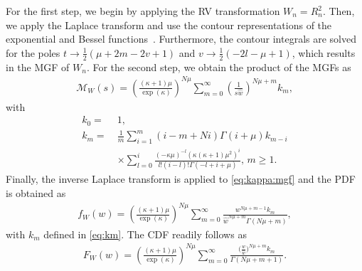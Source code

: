 \documentclass[journal,twocolumn]{IEEEtran}
\begin{document}
For the first step, we begin by applying the \ac{RV} transformation $W_n = R_n^2$. Then, we apply the Laplace transform and use the contour representations of the exponential and Bessel functions~\cite[Eq.~(03.02.07.0009.01)]{WolframResearch}. Furthermore, the contour integrals are solved for the poles $t\to \frac{1}{2} (\mu +2 m-2 v+1)$ and $v\to \frac{1}{2} (-2 l-\mu +1)$, which results in the \ac{MGF} of $W_n$. For the second step, we obtain the product of the \acp{MGF} as
\begin{align} \label{eq:kappa:mgf}
        \mathcal{M}_W (s) = \left(\frac{(\kappa +1) \mu }{\exp(\kappa) }\right)^{N \mu } \sum_{m=0}^{\infty}\left(\frac{1}{s \hat{w}}\right)^{N \mu + m} k_m,
\end{align}
with
\begin{subequations} \label{eq:km}
\begin{align}
    k_0 = \ & 1, \label{eq:km0} \\
    k_m = \ & \frac{1}{m} \sum_{i=1}^{m}(i-m+N i) \Gamma (i+\mu ) k_{m-i} \nonumber \\
    & \times \sum_{l=0}^i \frac{\left(-\kappa  \mu \right)^{-l} \left(\kappa  (\kappa +1) \mu ^2\right)^i}{l! (i-l)! \Gamma (-l+i+\mu )}, \, m\geq 1. \label{eq:km1}
\end{align}
\end{subequations}
Finally, the inverse Laplace transform is applied to \eqref{eq:kappa:mgf} and the \ac{PDF} is obtained as
\begin{align} \label{eq:pdf_snr}
        f_{W}(w) = \left(\frac{(\kappa +1) \mu }{\exp(\kappa) }\right)^{N \mu } \sum_{m=0}^{\infty}\frac{ w^{N \mu + m-1} k_m}{ \hat{w}^{N \mu+ m} \Gamma (N \mu + m )},
\end{align}
with $k_m$ defined in \eqref{eq:km}. The \ac{CDF} readily follows as
\begin{align} \label{eq:cdf_snr}
        F_{W}(w) = \left(\frac{(\kappa +1) \mu }{\exp(\kappa) }\right)^{N \mu } \sum_{m=0}^{\infty}\frac{\big(\frac{w}{\hat{w}}\big)^{N \mu + m} k_m}{\Gamma (N \mu + m + 1)}.
\end{align}
\end{document}
